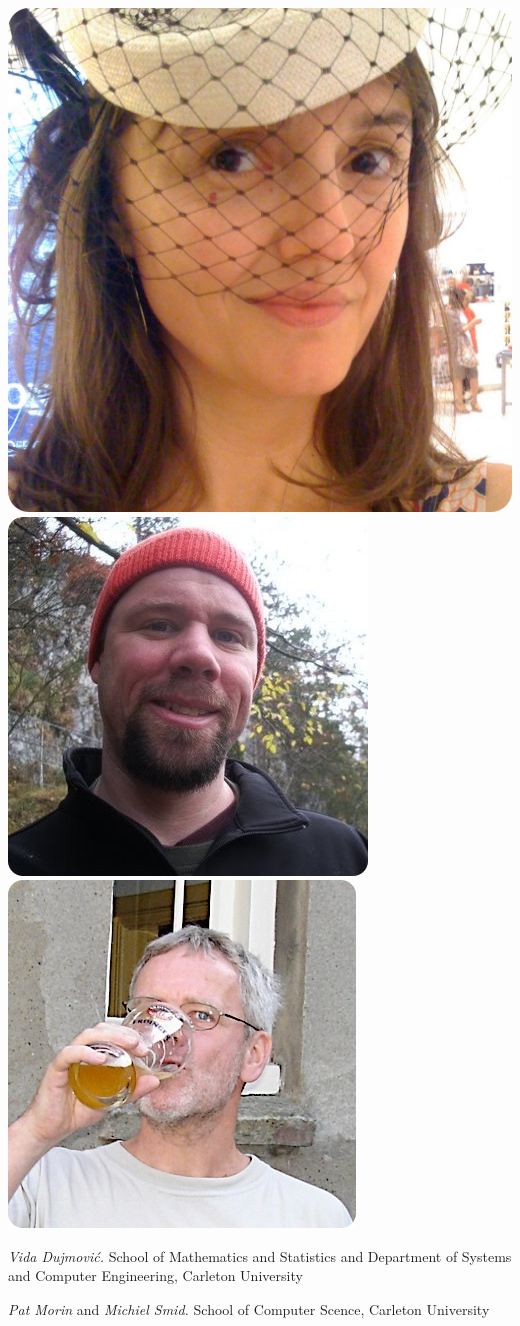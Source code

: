 \documentclass{patmorin}
\begin{document}
\noindent
\includegraphics[width=.31\textwidth]{vida-b}%
\hspace{.035\textwidth}%
\includegraphics[width=.31\textwidth]{pat-b}%
\hspace{.035\textwidth}%
\includegraphics[width=.31\textwidth]{michiel-b}%

\noindent\emph{Vida Dujmovi\'c.}
School of Mathematics and Statistics and Department of Systems and Computer Engineering, Carleton University

\noindent\emph{Pat Morin} and \emph{Michiel Smid.}
School of Computer Scence, Carleton University
\end{document}
